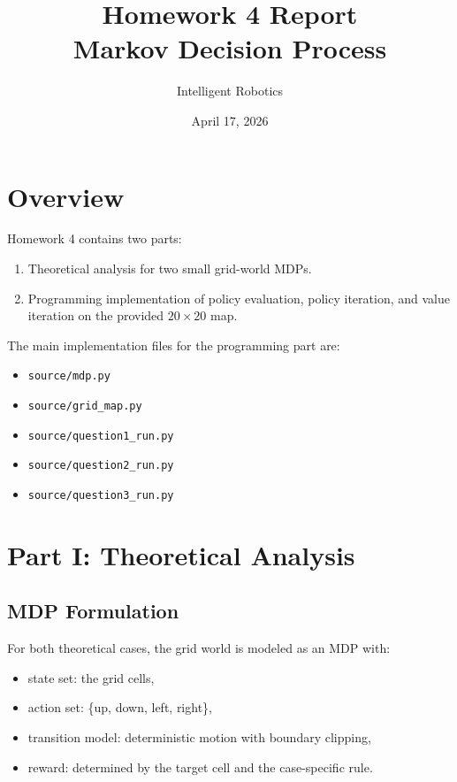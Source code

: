 \documentclass[11pt,a4paper]{article}
\title{Homework 4 Report\\Markov Decision Process}
\author{Intelligent Robotics}
\date{April 17, 2026}
\begin{document}
\maketitle

\section{Overview}

Homework 4 contains two parts:

\begin{enumerate}
    \item Theoretical analysis for two small grid-world MDPs.
    \item Programming implementation of policy evaluation, policy iteration, and value iteration on the provided $20 \times 20$ map.
\end{enumerate}

The main implementation files for the programming part are:

\begin{itemize}
    \item \texttt{source/mdp.py}
    \item \texttt{source/grid\_map.py}
    \item \texttt{source/question1\_run.py}
    \item \texttt{source/question2\_run.py}
    \item \texttt{source/question3\_run.py}
\end{itemize}

\section{Part I: Theoretical Analysis}

\subsection{MDP Formulation}

For both theoretical cases, the grid world is modeled as an MDP with:

\begin{itemize}
    \item state set: the grid cells,
    \item action set: \{up, down, left, right\},
    \item transition model: deterministic motion with boundary clipping,
    \item reward: determined by the target cell and the case-specific rule.
\end{itemize}
\end{document}
